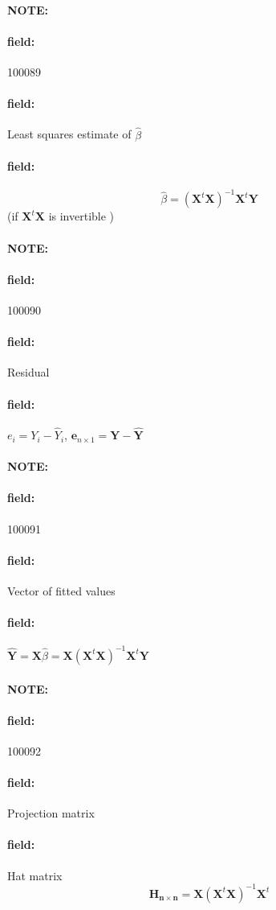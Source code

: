 \documentclass[12pt]{article}
\newenvironment{note}{\paragraph{NOTE:}}{}
\newenvironment{field}{\paragraph{field:}}{}
\begin{document}
\begin{note} \begin{field} \tiny 100089 \end{field}
  \begin{field}
    Least squares estimate of $\hat{\beta}$
  \end{field}
  \begin{field}
    $$ \hat{\beta} = (\mathbf{X}^t \mathbf{X})^{-1} \mathbf{X}^t \mathbf{Y} $$ (if $\mathbf{X}^t \mathbf{X}$ is invertible )
  \end{field}
\end{note}

\begin{note} \begin{field} \tiny 100090 \end{field}
  \begin{field}
    Residual
  \end{field}
  \begin{field}
    $e_i = Y_i - \hat{Y}_i$, $\mathbf{e}_{n\times 1} = \mathbf{Y} - \hat{\mathbf{Y}}$
  \end{field}
\end{note}

\begin{note} \begin{field} \tiny 100091 \end{field}
  \begin{field}
    Vector of fitted values
  \end{field}
  \begin{field}
    $\hat{\mathbf{Y}} = \mathbf{X}\hat{\beta} = \mathbf{X} (\mathbf{X}^t \mathbf{X})^{-1} \mathbf{X}^t \mathbf{Y}$
  \end{field}
\end{note}

\begin{note} \begin{field} \tiny 100092 \end{field}
  \begin{field}
    Projection matrix
  \end{field}
  \begin{field}
    Hat matrix
    $$\mathbf{H_{n \times n}} = \mathbf{X} (\mathbf{X}^t \mathbf{X})^{-1} \mathbf{X}^t$$
  \end{field}
\end{note}
\end{document}
